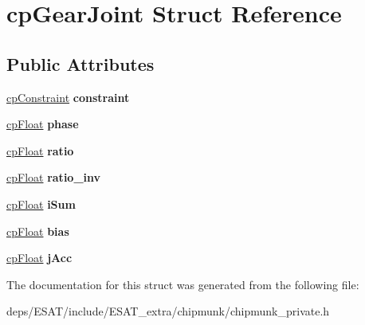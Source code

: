 \hypertarget{structcp_gear_joint}{}\section{cp\+Gear\+Joint Struct Reference}
\label{structcp_gear_joint}
\subsection*{Public Attributes}
\begin{DoxyCompactItemize}
\item 
\mbox{\label{structcp_gear_joint_acb21ac29bbf98409162715a54988564a}} 
\mbox{\hyperlink{structcp_constraint}{cp\+Constraint}} {\bfseries constraint}
\item 
\mbox{\label{structcp_gear_joint_ae255b8761ec6a976ca56a119eaf7fda5}} 
\mbox{\hyperlink{group__basic_types_gac1ed65573e035bf892505768c852d8d3}{cp\+Float}} {\bfseries phase}
\item 
\mbox{\label{structcp_gear_joint_a7934797f6b15a2456a1b5dc95ff8f3f6}} 
\mbox{\hyperlink{group__basic_types_gac1ed65573e035bf892505768c852d8d3}{cp\+Float}} {\bfseries ratio}
\item 
\mbox{\label{structcp_gear_joint_a8ba9f80613eb37c26766e1cfd4fe2d29}} 
\mbox{\hyperlink{group__basic_types_gac1ed65573e035bf892505768c852d8d3}{cp\+Float}} {\bfseries ratio\+\_\+inv}
\item 
\mbox{\label{structcp_gear_joint_a2b2841e7f22baba0db78dc238d6b3520}} 
\mbox{\hyperlink{group__basic_types_gac1ed65573e035bf892505768c852d8d3}{cp\+Float}} {\bfseries i\+Sum}
\item 
\mbox{\label{structcp_gear_joint_a457177bdcb71ce3807df116a611bd36e}} 
\mbox{\hyperlink{group__basic_types_gac1ed65573e035bf892505768c852d8d3}{cp\+Float}} {\bfseries bias}
\item 
\mbox{\label{structcp_gear_joint_a3910d5240112327dd2a4f5ccc9170cf0}} 
\mbox{\hyperlink{group__basic_types_gac1ed65573e035bf892505768c852d8d3}{cp\+Float}} {\bfseries j\+Acc}
\end{DoxyCompactItemize}


The documentation for this struct was generated from the following file\+:\begin{DoxyCompactItemize}
\item 
deps/\+E\+S\+A\+T/include/\+E\+S\+A\+T\+\_\+extra/chipmunk/chipmunk\+\_\+private.\+h\end{DoxyCompactItemize}
